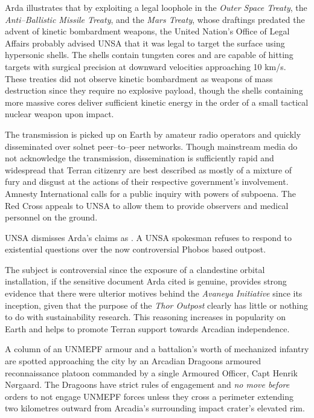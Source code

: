 Arda illustrates that by exploiting a legal loophole in the {\it Outer Space Treaty}, the {\it Anti--Ballistic Missile Treaty}, and the {\it Mars Treaty}, whose draftings predated the advent of kinetic bombardment weapons, the United Nation's Office of Legal Affairs probably advised UNSA that it was legal to target the surface using hypersonic shells. The shells contain tungsten cores and are capable of hitting targets with surgical precision at downward velocities approaching 10 km/s. These treaties did not observe kinetic bombardment as weapons of mass destruction since they require no explosive payload, though the shells containing more massive cores deliver sufficient kinetic energy in the order of a small tactical nuclear weapon upon impact.

The transmission is picked up on Earth by amateur radio operators and quickly disseminated over solnet peer--to--peer networks. Though mainstream media do not acknowledge the transmission, dissemination is sufficiently rapid and widespread that Terran citizenry are best described as mostly of a mixture of fury and disgust at the actions of their respective government's involvement. Amnesty International calls for a public inquiry with powers of subpoena. The Red Cross appeals to UNSA to allow them to provide observers and medical personnel on the ground.

UNSA dismisses Arda's claims as . A UNSA spokesman refuses to respond to existential questions over the now controversial Phobos based outpost. 

The subject is controversial since the exposure of a clandestine orbital installation, if the sensitive document Arda cited is genuine, provides strong evidence that there were ulterior motives behind the {\it Avaneya Initiative} since its inception, given that the purpose of the {\it Thor Outpost} clearly has little or nothing to do with sustainability research. This reasoning increases in popularity on Earth and helps to promote Terran support towards Arcadian independence.
\StopTimelineDate

A column of an UNMEPF armour and a battalion's worth of mechanized infantry are spotted approaching the city by an Arcadian Dragoons armoured reconnaissance platoon commanded by a single Armoured Officer, Capt Henrik Nørgaard. The Dragoons have strict rules of engagement and {\it no move before} orders to not engage UNMEPF forces unless they cross a perimeter extending two kilometres outward from Arcadia's surrounding impact crater's elevated rim.

